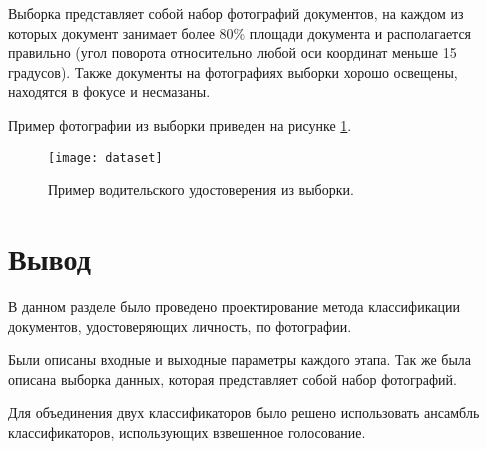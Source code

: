 Выборка представляет собой набор фотографий документов, на каждом из которых документ занимает более 80\% площади документа и располагается правильно (угол поворота относительно любой оси координат меньше 15 градусов). Также документы на фотографиях выборки хорошо освещены, находятся в фокусе и несмазаны.

Пример фотографии из выборки приведен на рисунке \ref{img:dataset}.

\begin{figure}[H]
	\centering
	\texttt{[image: dataset]}
	\caption{Пример водительского удостоверения из выборки. }
	\label{img:dataset}
\end{figure}

\section{Вывод}

В данном разделе было проведено проектирование метода классификации документов, удостоверяющих личность, по фотографии.

Были описаны входные и выходные параметры каждого этапа. Так же была описана выборка данных, которая представляет собой набор фотографий. 

Для объединения двух классификаторов было решено использовать ансамбль классификаторов, использующих взвешенное голосование.